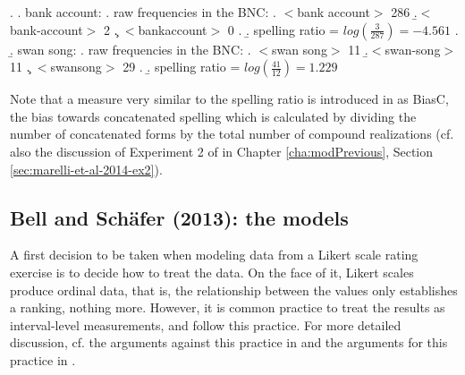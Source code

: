 \ex. \a. bank account:  
\a. raw frequencies in the BNC:
\a. $<$bank account$>$\hspace*{.01cm} 286
\b.$<$bank-account$>$\hspace*{.41cm} 2
\c. $<$bankaccount$>$\hspace*{.55cm} 0 \vspace*{.5em}
\z.
\b. spelling ratio = \( \displaystyle log(\frac{3}{287}) = -4.561 \) %
\z.
\b. swan song:  
\a. raw frequencies in the BNC:
\a. $<$swan song$>$\hspace*{1cm} 11
\b.$<$swan-song$>$\hspace*{.98cm} 11
\c. $<$swansong$>$\hspace*{1.1cm} 29 \vspace*{.5em}
\z.
\b. spelling ratio = \( \displaystyle log(\frac{41}{12}) = 1.229 \) %

%
%
%
%
Note that a measure very similar to the spelling ratio is introduced
in \citet[954]{KupermanandBertram:2013} as BiasC, the bias towards
concatenated spelling which is calculated by dividing the number of
concatenated forms by the total number of compound realizations
(cf. also the discussion of Experiment 2 of \citealt{Marellietal:2014}
in Chapter \ref{cha:modPrevious}, Section
\ref{sec:marelli-et-al-2014-ex2}).




\subsection{Bell and Schäfer (2013): the models}
\label{sec:bell-and-schaefer-models}

A first decision to be taken when modeling data from a Likert scale
rating exercise is to decide how to treat the data. On the face of
it, Likert scales produce ordinal data, that is, the relationship
between the values only establishes a ranking, nothing more. However,
it is common practice to treat the results as interval-level
measurements, and \citet{BellandSchaefer:2013}
follow this practice. For more detailed discussion, 
cf. the arguments against this practice in \citet{Jamieson:2004} and
the arguments for this practice in \citet{Norman:2010}.

